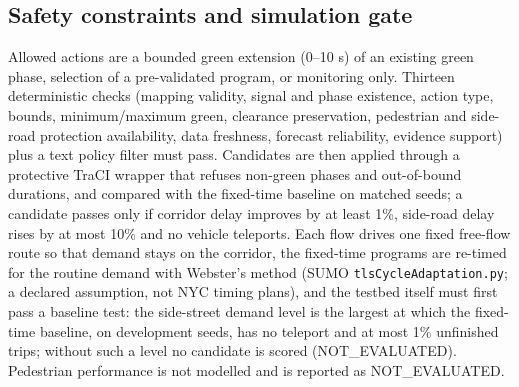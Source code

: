 \subsection{Safety constraints and simulation gate}
Allowed actions are a bounded green extension (0--10 s) of an existing green phase, selection of a pre-validated
program, or monitoring only. Thirteen deterministic checks (mapping validity, signal and phase existence, action type,
bounds, minimum/maximum green, clearance preservation, pedestrian and side-road protection availability, data freshness,
forecast reliability, evidence support) plus a text policy filter must pass. Candidates are then applied through a
protective TraCI wrapper that refuses non-green phases and out-of-bound durations, and compared with the fixed-time
baseline on matched seeds; a candidate passes only if corridor delay improves by at least 1\%, side-road delay rises by
at most 10\% and no vehicle teleports. Each flow drives one fixed free-flow route so that demand stays on the corridor,
the fixed-time programs are re-timed for the routine demand with Webster's method (SUMO
\texttt{tlsCycleAdaptation.py}; a declared assumption, not NYC timing plans), and the testbed itself must first pass a
baseline test: the side-street demand level is the largest at which the
fixed-time baseline, on development seeds, has no teleport and at most 1\% unfinished trips; without such a level no
candidate is scored (NOT\_EVALUATED). Pedestrian performance is not modelled and is reported as NOT\_EVALUATED.
